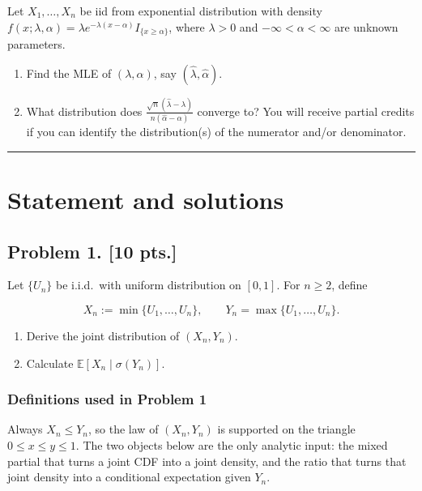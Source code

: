\documentclass[11pt,a4paper]{article}
\newcommand{\examstatement}[1]{%
  \par\addvspace{0.85em}%
  \noindent{\bfseries #1}\par\nobreak\addvspace{0.28em}%
}
\begin{document}
\examstatement{Problem 11. [15 pts.]}
Let \( X_1, \dots, X_n \) be iid from exponential distribution with density \( f(x; \lambda, \alpha) = \lambda e^{-\lambda(x-\alpha)} I_{\{x \ge \alpha\}} \), where \( \lambda > 0 \) and \( -\infty < \alpha < \infty \) are unknown parameters.
\begin{enumerate}[label=(\alph*)]
    \item Find the MLE of \( (\lambda, \alpha) \), say \( (\hat{\lambda}, \hat{\alpha}) \).
    \item What distribution does \( \frac{\sqrt{n}(\hat{\lambda} - \lambda)}{n(\hat{\alpha} - \alpha)} \) converge to? You will receive partial credits if you can identify the distribution(s) of the numerator and/or denominator.
\end{enumerate}

\noindent\rule{\linewidth}{0.4pt}

\section{Statement and solutions}

\subsection{Problem 1. [10 pts.]}
Let \( \{U_n\} \) be i.i.d.\ with uniform distribution on \( [0, 1] \). For \( n \ge 2 \), define

\[
X_n := \min\{U_1, \dots, U_n\}, \qquad Y_n = \max\{U_1, \dots, U_n\}.
\]

\begin{enumerate}[label=(\arabic*)]
    \item Derive the joint distribution of \( (X_n, Y_n) \).
    \item Calculate \( \mathbb{E}[X_n \mid \sigma(Y_n)] \).
\end{enumerate}

\setcounter{section}{1}

\subsubsection{Definitions used in Problem 1}

Always \( X_n\le Y_n \), so the law of \( (X_n,Y_n) \) is supported on the triangle \( 0\le x\le y\le 1 \). The two objects below are the only analytic input: the mixed partial that turns a joint CDF into a joint density, and the ratio that turns that joint density into a conditional expectation given \( Y_n \).
\end{document}

